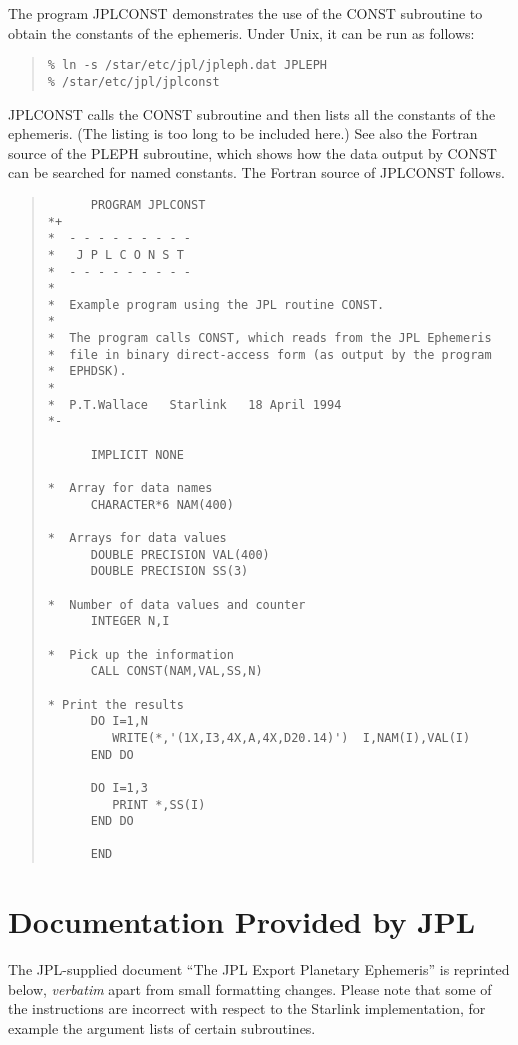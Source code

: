 \documentclass[twoside,11pt]{article}
\newcommand{\xlabel}[1]{}
\renewcommand{\_}{\texttt{\symbol{95}}}
\newcommand{\latexonlysmall}{\small}
\newcommand{\latexonlysmall}{}
\begin{document}
The program JPLCONST demonstrates the use of the CONST subroutine to obtain the
constants of the ephemeris.  Under Unix, it can be run as follows:

\begin{quote}
\begin{verbatim}
% ln -s /star/etc/jpl/jpleph.dat JPLEPH
% /star/etc/jpl/jplconst
\end{verbatim}
\end{quote}

JPLCONST calls the CONST subroutine and then
lists all the constants of the ephemeris.  (The listing is too long
to be included here.)
See also the Fortran source of the PLEPH subroutine, which shows
how the data output by CONST can be searched for named constants.
The Fortran source of JPLCONST follows.

\begin{quote}
\latexonlysmall
\begin{verbatim}
      PROGRAM JPLCONST
*+
*  - - - - - - - - -
*   J P L C O N S T
*  - - - - - - - - -
*
*  Example program using the JPL routine CONST.
*
*  The program calls CONST, which reads from the JPL Ephemeris
*  file in binary direct-access form (as output by the program
*  EPHDSK).
*
*  P.T.Wallace   Starlink   18 April 1994
*-

      IMPLICIT NONE

*  Array for data names
      CHARACTER*6 NAM(400)

*  Arrays for data values
      DOUBLE PRECISION VAL(400)
      DOUBLE PRECISION SS(3)

*  Number of data values and counter
      INTEGER N,I

*  Pick up the information
      CALL CONST(NAM,VAL,SS,N)

* Print the results
      DO I=1,N
         WRITE(*,'(1X,I3,4X,A,4X,D20.14)')  I,NAM(I),VAL(I)
      END DO

      DO I=1,3
         PRINT *,SS(I)
      END DO

      END
\end{verbatim}
\end{quote}

\newpage

\section{\xlabel{documentation_provided_by_jpl}Documentation Provided by JPL}
\label{documentation_provided_by_jpl}

The JPL-supplied document ``The JPL Export Planetary Ephemeris'' is
reprinted below, \textit{verbatim}\/ apart from small formatting changes.
Please note that some of the instructions are incorrect with respect to
the Starlink implementation, for example the argument lists of certain
subroutines.
\end{document}
